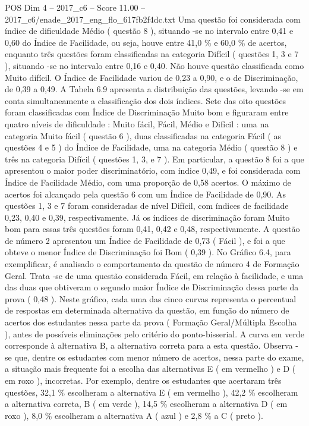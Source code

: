 \begin{textsample}{POS Dim 4 – 2017\_c6 – Score 11.00 – 2017\_c6/enade\_2017\_eng\_flo\_617fb2f4dc.txt}
Uma questão foi considerada com índice de dificuldade Médio ( questão 8 ), situando -se no intervalo entre 0,41 e 0,60 do Índice de Facilidade, ou seja, houve entre 41,0 \% e 60,0 \% de acertos, enquanto três questões foram classificadas na categoria Difícil ( questões 1, 3 e 7 ), situando -se no intervalo entre 0,16 e 0,40.
Não houve questão classificada como Muito difícil.
O Índice de Facilidade variou de 0,23 a 0,90, e o de Discriminação, de 0,39 a 0,49.
A Tabela 6.9 apresenta a distribuição das questões, levando -se em conta simultaneamente a classificação dos dois índices.
Sete das oito questões foram classificadas com Índice de Discriminação Muito bom e figuraram entre quatro níveis de dificuldade : Muito fácil, Fácil, Médio e Difícil : uma na categoria Muito fácil ( questão 6 ), duas classificadas na categoria Fácil ( as questões 4 e 5 ) do Índice de Facilidade, uma na categoria Médio ( questão 8 ) e três na categoria Difícil ( questões 1, 3, e 7 ).
Em particular, a questão 8 foi a que apresentou o maior poder discriminatório, com índice 0,49, e foi considerada com Índice de Facilidade Médio, com uma proporção de 0,58 acertos.
O máximo de acertos foi alcançado pela questão 6 com um Índice de Facilidade de 0,90.
As questões 1, 3 e 7 foram consideradas de nível Difícil, com índices de facilidade 0,23, 0,40 e 0,39, respectivamente.
Já os índices de discriminação foram Muito bom para essas três questões foram 0,41, 0,42 e 0,48, respectivamente.
A questão de número 2 apresentou um Índice de Facilidade de 0,73 ( Fácil ), e foi a que obteve o menor Índice de Discriminação foi Bom ( 0,39 ).
No Gráfico 6.4, para exemplificar, é analisado o comportamento da questão de número 4 de Formação Geral.
Trata -se de uma questão considerada Fácil, em relação à facilidade, e uma das duas que obtiveram o segundo maior Índice de Discriminação dessa parte da prova ( 0,48 ).
Neste gráfico, cada uma das cinco curvas representa o percentual de respostas em determinada alternativa da questão, em função do número de acertos dos estudantes nessa parte da prova ( Formação Geral/Múltipla Escolha ), antes de possíveis eliminações pelo critério do ponto-bisserial.
A curva em verde corresponde à alternativa B, a alternativa correta para a esta questão.
Observa -se que, dentre os estudantes com menor número de acertos, nessa parte do exame, a situação mais frequente foi a escolha das alternativas E ( em vermelho ) e D ( em roxo ), incorretas.
Por exemplo, dentre os estudantes que acertaram três questões, 32,1 \% escolheram a alternativa E ( em vermelho ), 42,2 \% escolheram a alternativa correta, B ( em verde ), 14,5 \% escolheram a alternativa D ( em roxo ), 8,0 \% escolheram a alternativa A ( azul ) e 2,8 \% a C ( preto ).

\end{textsample}
